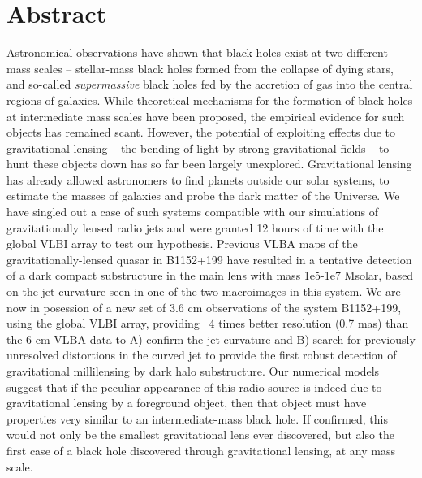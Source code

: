 \documentclass[a4paper, 11pt]{article}
\begin{document}
\section{Abstract}
Astronomical observations have shown that black holes exist at two different mass scales – stellar-mass black holes formed from the collapse of dying stars, and so-called {\it supermassive} black holes fed by the accretion of gas into the central regions of galaxies. While theoretical mechanisms for the formation of black holes at intermediate mass scales have been proposed, the empirical evidence for such objects has remained scant. However, the potential of exploiting effects due to gravitational lensing – the bending of light by strong gravitational fields – to hunt these objects down has so far been largely unexplored.
Gravitational lensing has already allowed astronomers to find planets outside our solar systems, to estimate the masses of galaxies and probe the dark matter of the Universe. We have singled out a case of such systems compatible with our simulations of gravitationally lensed radio jets and were granted 12 hours of time with the global VLBI array to test our hypothesis. Previous VLBA maps of the gravitationally-lensed quasar in B1152+199 have resulted in a tentative detection of a dark compact substructure in the main lens with mass 1e5-1e7 Msolar, based on the jet curvature seen in one of the two macroimages in this system. We are now in posession of a new set of 3.6 cm observations of the system B1152+199, using the global VLBI array, providing ~4 times better resolution (0.7 mas) than the 6 cm VLBA data to A) confirm the jet curvature and B) search for previously unresolved distortions in the curved jet to provide the first robust detection of gravitational millilensing by dark halo substructure. Our numerical models suggest that if the peculiar appearance of this radio source is indeed due to gravitational lensing by a foreground object, then that object must have properties very similar to an intermediate-mass black hole. If confirmed, this would not only be the smallest gravitational lens ever discovered, but also the first case of a black hole discovered through gravitational lensing, at any mass scale.
\end{document}
